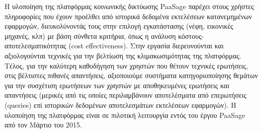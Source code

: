 \begin{titlepage}
Η υλοποίηση της πλατφόρμας κοινωνικής δικτύωσης PaaSage παρέχει στους χρήστες πληροφορίες που έχουν προέλθει από ιστορικά δεδομένα εκτελέσεων κατανεμημένων εφαρμογών, διευκολύνοντάς τους στην επιλογή εγκατάστασης (νέφη, εικονικές μηχανές, κλπ) με βάση σύνθετα κριτήρια, όπως η ανάλυση κόστους-αποτελεσματικότητας (cost effectiveness).  Στην εργασία διερευνούνται και αξιολογούνται τεχνικές για την βελτίωση της κλιμακωσιμότητας της πλατφόρμας. Τέλος, για την καλύτερη καθοδήγηση των χρηστών που θέτουν τεχνικές ερωτήσεις, στις βέλτιστες πιθανές απαντήσεις, αξιοποιούμε συστήματα κατηγοριοποίησης θεμάτων για την συσχέτιση ερωτήσεων των χρηστών με αποθηκευμένες ερωτήσεις και απαντήσεις (μερικές από τις οποίες περιλαμβάνουν αποτελέσματα από επερωτήσεις (queries) επί ιστορικών δεδομένων αποτελεσμάτων εκτελέσεων εφαρμογών). Η υλοποίηση της πλατφόρμας είναι σε πιλοτική λειτουργία εντός του έργου PaaSage από τον Μάρτιο του 2015.

\vfill

\end{titlepage}

